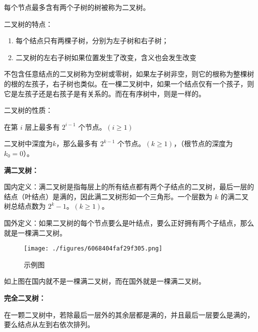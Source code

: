 
每个节点最多含有两个子树的树被称为二叉树。

二叉树的特点：

\begin{enumerate}
\item 每个结点只有两棵子树，分别为左子树和右子树；
\item 二叉树的左右子树如果位置发生了改变，含义也会发生改变
\end{enumerate}

不包含任意结点的二叉树称为空树或零树，如果左子树非空，则它的根称为整棵树的根的左孩子，右子树也类似。在一棵二叉树中，如果一个结点仅有一个孩子，则它是左孩子还是右孩子是有关系的。而在有序树中，则是一样的。

二叉树的性质：

在第 $i$ 层上最多有 $2 ^ {i - 1}$ 个节点。$(i\geq1)$

二叉树中深度为$k$，那么最多有 $2 ^ {k - 1}$ 个节点。$(k\geq1)$，（根节点的深度为 $k_0 = 0$）。

\textbf{满二叉树：}

国内定义：满二叉树是指每层上的所有结点都有两个子结点的二叉树，最后一层的结点（叶结点）是满的，因此满二叉树形如一个三角形。一个层数为 $k$ 的满二叉树总结点数为 $2^k - 1$。$(k\geq1)$。

国外定义：如果二叉树的每个节点要么是叶结点，要么正好拥有两个子结点，那么就是一棵满二叉树。

\begin{figure}[ht]
\centering
\texttt{[image: ./figures/6068404faf29f305.png]}
\caption{示例图} \label{fig_tree_2}
\end{figure}

如上图在国内就不是一棵满二叉树，而在国外就是一棵满二叉树。

\textbf{完全二叉树：}

在一颗二叉树中，若除最后一层外的其余层都是满的，并且最后一层要么是满的，要么结点从左到右依次排列。